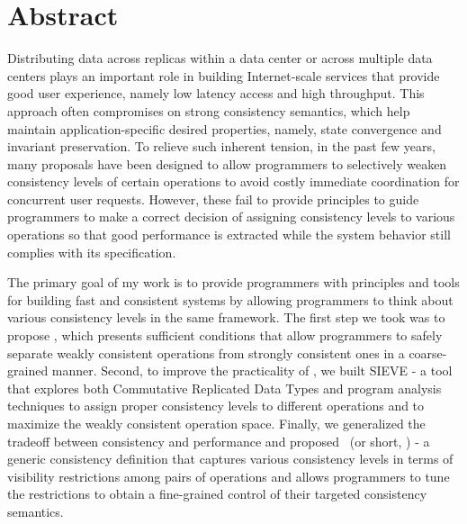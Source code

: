
\section*{Abstract}

Distributing data across replicas within a data center or across multiple data centers
plays an important role in building Internet-scale services that provide
good user experience, namely low latency access and high throughput. This approach
often compromises on strong consistency semantics, which help maintain
application-specific desired properties, namely, state convergence and invariant preservation. 
To relieve such inherent tension, in the past few years, many proposals have been
designed to allow programmers to selectively weaken consistency levels of
certain operations to avoid costly immediate coordination for concurrent user requests. However,
these fail to provide principles to guide programmers to make a correct decision
of assigning consistency levels to various operations so that
good performance is extracted while the system behavior still complies with its specification.

The primary goal of my work is to provide programmers with principles and tools for building
fast and consistent systems by allowing programmers
to think about various consistency levels in the same framework. The first step we
took was to propose \RBCN, which presents sufficient
conditions that allow programmers to safely separate weakly consistent operations from
strongly consistent ones in a coarse-grained manner. Second, to improve the practicality of \RBCN,
we built SIEVE - a tool that explores
both Commutative Replicated Data Types and program analysis techniques to assign proper consistency levels
to different operations and to maximize the weakly consistent operation space.
Finally, we generalized the tradeoff  between consistency and performance and proposed \PRCNF\ (or short, \PRCN) - a generic
consistency definition that captures various consistency levels in terms of visibility restrictions
among pairs of operations and allows programmers to tune the restrictions to obtain a fine-grained control of
their targeted consistency semantics.



\cleardoublepage
{}
